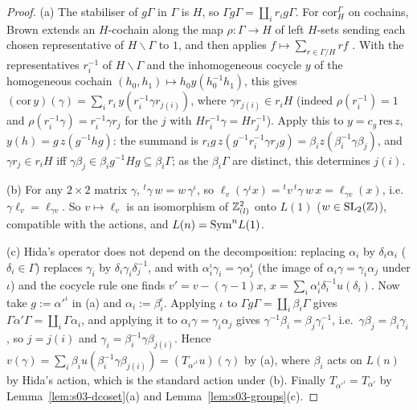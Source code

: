 \begin{proof}
(a) The stabiliser of $g\Gamma$ in $\Gamma$ is $H$, so $\Gamma g\Gamma=\coprod_ir_ig\Gamma$. For $\mathrm{cor}^\Gamma_H$ on cochains, Brown extends an $H$-cochain along the map
$\rho:\Gamma\to H$ of left $H$-sets sending each chosen representative of $H\backslash\Gamma$ to $1$, and then applies $f\mapsto\sum_{r\in\Gamma/H}rf$
. With the representatives $r_i^{-1}$ of $H\backslash\Gamma$ and the inhomogeneous cocycle $y$ of the
homogeneous cochain $(h_0,h_1)\mapsto h_0y(h_0^{-1}h_1)$, this gives $(\mathrm{cor}\,y)(\gamma)=\sum_ir_i\,y(r_i^{-1}\gamma r_{j(i)})$, where $\gamma r_{j(i)}\in r_iH$
(indeed $\rho(r_i^{-1})=1$ and $\rho(r_i^{-1}\gamma)=r_i^{-1}\gamma r_{j}$ for the $j$ with $Hr_i^{-1}\gamma=Hr_j^{-1}$). Apply this to $y=c_g\,\mathrm{res}\,z$,
$y(h)=g\,z(g^{-1}hg)$: the summand is $r_ig\,z(g^{-1}r_i^{-1}\gamma r_jg)=\beta_iz(\beta_i^{-1}\gamma\beta_j)$, and $\gamma r_j\in r_iH$ iff $\gamma\beta_j\in\beta_ig^{-1}Hg\subseteq\beta_i\Gamma$;
as the $\beta_i\Gamma$ are distinct, this determines $j(i)$.

(b) For any $2\times2$ matrix $\gamma$, ${}^t\gamma\,w=w\,\gamma^\iota$, so $\ell_v(\gamma^\iota x)={}^tv\,{}^t\gamma\,w\,x=\ell_{\gamma v}(x)$, i.e.\ $\gamma\ell_v=\ell_{\gamma v}$. So
$v\mapsto\ell_v$ is an isomorphism of $\mathbb{Z}_{(l)}^2$ onto $L(1)$ ($w\in\mathrm{SL}_2(\mathbb{Z})$), compatible with the actions, and $L(n)=\mathrm{Sym}^nL(1)$.

(c) Hida's operator does not depend on the decomposition: replacing $\alpha_i$ by $\delta_i\alpha_i$ ($\delta_i\in\Gamma$) replaces $\gamma_i$ by $\delta_i\gamma_i\delta_j^{-1}$, and with
$\alpha_i^\iota\gamma_i=\gamma\alpha_j^\iota$ (the image of $\alpha_i\gamma=\gamma_i\alpha_j$ under $\iota$) and the cocycle rule one finds $v'=v-(\gamma-1)x$,
$x=\sum_i\alpha_i^\iota\delta_i^{-1}u(\delta_i)$. Now take $g:=\alpha'^\iota$ in (a) and $\alpha_i:=\beta_i^\iota$. Applying $\iota$ to $\Gamma g\Gamma=\coprod_i\beta_i\Gamma$ gives
$\Gamma\alpha'\Gamma=\coprod_i\Gamma\alpha_i$, and applying it to $\alpha_i\gamma=\gamma_i\alpha_j$ gives $\gamma^{-1}\beta_i=\beta_j\gamma_i^{-1}$, i.e.\ $\gamma\beta_j=\beta_i\gamma_i$, so
$j=j(i)$ and $\gamma_i=\beta_i^{-1}\gamma\beta_{j(i)}$. Hence $v(\gamma)=\sum_i\beta_iu(\beta_i^{-1}\gamma\beta_{j(i)})=(T_{\alpha'^\iota}u)(\gamma)$ by (a), where $\beta_i$ acts on
$L(n)$ by Hida's action, which is the standard action under (b). Finally $T_{\alpha'^\iota}=T_{\alpha'}$ by Lemma~\ref{lem:s03-dcoset}(a) and Lemma~\ref{lem:s03-groups}(c).


\end{proof}
